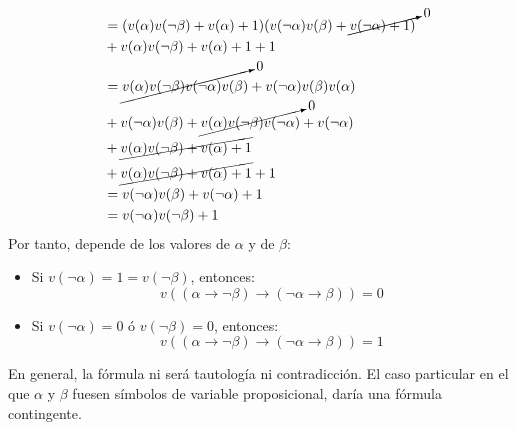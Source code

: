 \begin{ejercicio}
\begin{enumerate}
\begin{align*}
                                                                                         &= (v(\alpha)v(\lnot\beta)+v(\alpha)+1)(v(\lnot\alpha)v(\beta)+\cancelto{0}{v(\lnot\alpha)+1)} \\
                &+ v(\alpha)v(\lnot\beta)+v(\alpha)+1+1 \\ 
                &= \cancelto{0}{v(\alpha)v(\lnot\beta)v(\lnot\alpha)v(\beta)} + v(\lnot\alpha)v(\beta)v(\alpha) \\
                &+ v(\lnot\alpha)v(\beta) + \cancelto{0}{v(\alpha)v(\lnot\beta)v(\lnot\alpha)} + v(\lnot\alpha) \\
                &+ \cancel{v(\alpha)v(\lnot\beta)+v(\alpha)+1} \\
                &+ \cancel{v(\alpha)v(\lnot\beta)+v(\alpha)+1}+1 \\
                &= v(\lnot\alpha)v(\beta)+v(\lnot\alpha)+1 \\ 
                &= v(\lnot\alpha)v(\lnot\beta) + 1 
            \end{align*}
            Por tanto, depende de los valores de $\alpha$ y de $\beta$:
            \begin{itemize}
                \item Si $v(\lnot\alpha)=1=v(\lnot\beta)$, entonces:
                    \begin{equation*}
                        v((\alpha\rightarrow\lnot\beta)\rightarrow(\lnot\alpha\rightarrow\beta))=0
                    \end{equation*}
                \item Si $v(\lnot\alpha)=0$ ó $v(\lnot\beta)=0$, entonces:
                    \begin{equation*}
                        v((\alpha\rightarrow\lnot\beta)\rightarrow(\lnot\alpha\rightarrow\beta)) = 1
                    \end{equation*}
            \end{itemize}
            En general, la fórmula ni será tautología ni contradicción. El caso particular en el que $\alpha$ y $\beta$ fuesen símbolos de variable proposicional, daría una fórmula contingente.
    \end{enumerate}
\end{ejercicio}

